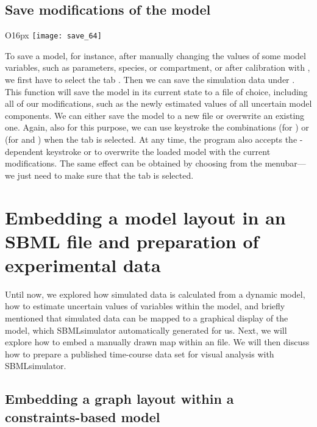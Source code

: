 \section{Save modifications of the model}
\label{ch:savesim}
\begin{wrapfigure}{O}{16px}
\vspace{\wrapfigspace}
\texttt{[image: save\_64]}
\end{wrapfigure}
To save a model, for instance, after manually changing the values of some model variables, such as parameters, species, or compartment, or after calibration with \EvA, we first have to select the tab .
Then we can save the simulation data under .
This function will save the model in its current state to a file of choice, including all of our modifications, such as the newly estimated values of all uncertain model components.
We can either save the model to a new file or overwrite an existing one.
Again, also for this purpose, we can use keystroke the combinations  (for \MacOSX) or  (for \Linux and \Windows) when the  tab is selected.
At any time, the program also accepts the \OS-dependent keystroke  or  to overwrite the loaded model with the current modifications.
The same effect can be obtained by choosing  from the menubar---we just need to make sure that the tab  is selected.



\chapter{Embedding a model layout in an SBML file and preparation of experimental data}
\label{chap:EmbeddingLayoutsInModels}

Until now, we explored how simulated data is calculated from a dynamic model, how to estimate uncertain values of variables within the model, and briefly mentioned that simulated data can be mapped to a graphical display of the model, which SBMLsimulator automatically generated for us.
Next, we will explore how to embed a manually drawn map within an \SBML file.
We will then discuss how to prepare a published time-course data set for visual analysis with SBMLsimulator.

\section{Embedding a graph layout within a constraints-based model}

